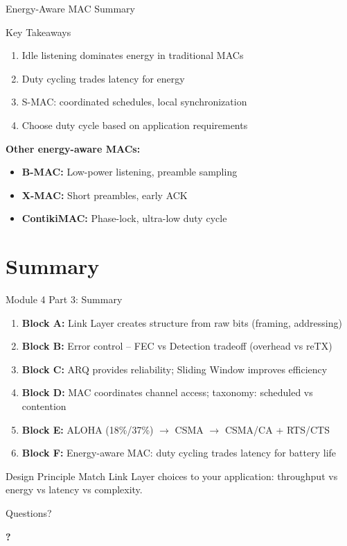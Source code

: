 \documentclass[aspectratio=169,11pt]{beamer}
\begin{document}
\begin{frame}{Energy-Aware MAC Summary}
    \begin{block}{Key Takeaways}
        \begin{enumerate}
            \item Idle listening dominates energy in traditional MACs
            \item Duty cycling trades latency for energy
            \item S-MAC: coordinated schedules, local synchronization
            \item Choose duty cycle based on application requirements
        \end{enumerate}
    \end{block}
    
    \vspace{0.3cm}
    \textbf{Other energy-aware MACs:}
    \begin{itemize}
        \item \textbf{B-MAC:} Low-power listening, preamble sampling
        \item \textbf{X-MAC:} Short preambles, early ACK
        \item \textbf{ContikiMAC:} Phase-lock, ultra-low duty cycle
    \end{itemize}
\end{frame}

\section{Summary}

\begin{frame}{Module 4 Part 3: Summary}
    \begin{enumerate}
        \item \textbf{Block A:} Link Layer creates structure from raw bits (framing, addressing)
        \item \textbf{Block B:} Error control -- FEC vs Detection tradeoff (overhead vs reTX)
        \item \textbf{Block C:} ARQ provides reliability; Sliding Window improves efficiency
        \item \textbf{Block D:} MAC coordinates channel access; taxonomy: scheduled vs contention
        \item \textbf{Block E:} ALOHA (18\%/37\%) $\rightarrow$ CSMA $\rightarrow$ CSMA/CA + RTS/CTS
        \item \textbf{Block F:} Energy-aware MAC: duty cycling trades latency for battery life
    \end{enumerate}
    
    \vspace{0.3cm}
    \begin{alertblock}{Design Principle}
        Match Link Layer choices to your application: throughput vs energy vs latency vs complexity.
    \end{alertblock}
\end{frame}

\begin{frame}{Questions?}
    \begin{center}
        \Huge\textbf{?}
    \end{center}
\end{frame}
\end{document}
